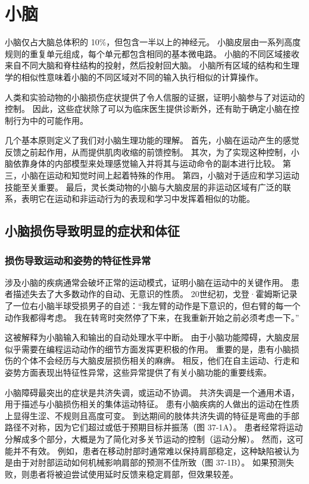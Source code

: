 \chapter{小脑} \label{chap:chap37}

小脑仅占大脑总体积的 10\%，但包含一半以上的神经元。 小脑皮层由一系列高度规则的重复单元组成，每个单元都包含相同的基本微电路。 小脑的不同区域接收来自不同大脑和脊柱结构的投射，然后投射回大脑。 小脑所有区域的结构和生理学的相似性意味着小脑的不同区域对不同的输入执行相似的计算操作。

人类和实验动物的小脑损伤症状提供了令人信服的证据，证明小脑参与了对运动的控制。 因此，这些症状除了可以为临床医生提供诊断外，还有助于确定小脑在控制行为中的可能作用。

几个基本原则定义了我们对小脑生理功能的理解。 首先，小脑在运动产生的感觉反馈之前起作用，从而提供肌肉收缩的前馈控制。 其次，为了实现这种控制，小脑依靠身体的内部模型来处理感觉输入并将其与运动命令的副本进行比较。 第三，小脑在运动和知觉时间上起着特殊的作用。 第四，小脑对于适应和学习运动技能至关重要。 最后，灵长类动物的小脑与大脑皮层的非运动区域有广泛的联系，表明它在运动和非运动行为的表现和学习中发挥着相似的功能。


\section{小脑损伤导致明显的症状和体征}
\subsection{损伤导致运动和姿势的特征性异常}
涉及小脑的疾病通常会破坏正常的运动模式，证明小脑在运动中的关键作用。 患者描述失去了大多数动作的自动、无意识的性质。 20世纪初，戈登·霍姆斯记录了一位右小脑半球受损男子的自述：“我左臂的动作是下意识的，但右臂的每一个动作我都得考虑。 我在转弯时突然停了下来，在我重新开始之前必须考虑一下。”

这被解释为小脑输入和输出的自动处理水平中断。 由于小脑功能障碍，大脑皮层似乎需要在编程运动动作的细节方面发挥更积极的作用。 重要的是，患有小脑损伤的个体不会经历与大脑皮层损伤相关的麻痹。 相反，他们在自主运动、行走和姿势方面表现出特征性异常，这些异常提供了有关小脑功能的重要线索。

小脑障碍最突出的症状是共济失调，或运动不协调。 共济失调是一个通用术语，用于描述与小脑损伤相关的集体运动特征。 患有小脑疾病的人做出的运动在性质上显得生涩、不规则且高度可变。 到达期间的肢体共济失调的特征是弯曲的手部路径不对称，因为它们超过或低于预期目标并振荡（图 37-1A）。 患者经常将运动分解成多个部分，大概是为了简化对多关节运动的控制（运动分解）。 然而，这可能并不有效。 例如，患者在移动肘部时通常难以保持肩部稳定，这种缺陷被认为是由于对肘部运动如何机械影响肩部的预测不佳所致（图 37-1B）。 如果预测失败，则患者将被迫尝试使用延时反馈来稳定肩部，但效果较差。

